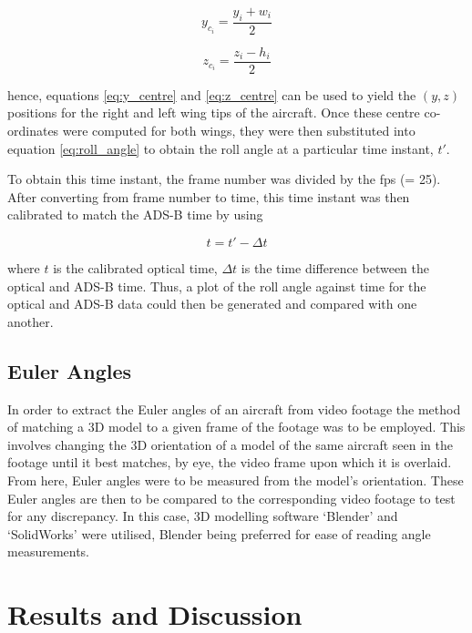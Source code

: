\documentclass[11pt]{article}
\begin{document}
\begin{equation}
\label{eq:y_centre}
y_{c_i} = \frac{y_i + w_i}{2}
\end{equation}


\begin{equation}
\label{eq:z_centre}
z_{c_i} = \frac{z_i - h_i}{2}
\end{equation}

hence, equations \eqref{eq:y_centre} and \eqref{eq:z_centre} can be used to yield the $(y,z)$ positions for the right and left wing tips of the aircraft. Once these centre co-ordinates were computed for both wings, they were then substituted into equation \eqref{eq:roll_angle} to obtain the roll angle at a particular time instant, $t'$. 

To obtain this time instant, the frame number was divided by the fps (= 25). After converting from frame number to time, this time instant was then calibrated to match the ADS-B time by using

\begin{equation}
\label{eq:}
t = {t' - \Delta{t}}
\end{equation}

where $t$ is the calibrated optical time, $\Delta{t}$ is the time difference between the optical and ADS-B time. Thus, a plot of the roll angle against time for the optical and ADS-B data could then be generated and compared with one another.


\subsection{Euler Angles}
\label{ssec:euler}

In order to extract the Euler angles of an aircraft from video footage the method of matching a 3D model to a given frame of the footage was to be employed. This involves changing the 3D orientation of a model of the same aircraft seen in the footage until it best matches, by eye, the video frame upon which it is overlaid. From here, Euler angles were to be measured from the model's orientation. These Euler angles are then to be compared to the corresponding video footage to test for any discrepancy. In this case, 3D modelling software `Blender' and `SolidWorks' were utilised, Blender being preferred for ease of reading angle measurements.

\section{Results and Discussion}
\label{sec:discussion}
\end{document}
